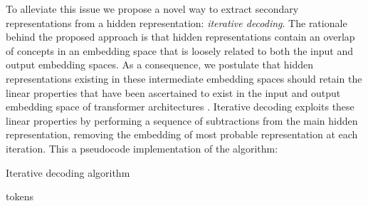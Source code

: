     To alleviate this issue we propose a novel way to extract secondary representations from a hidden representation: \emph{iterative decoding}.
    The rationale behind the proposed approach is that hidden representations contain an overlap of concepts in an embedding space that is loosely related to both the input and output embedding spaces.
    As a consequence, we postulate that hidden representations existing in these intermediate embedding spaces should retain the linear properties that have been ascertained to exist in the input and output embedding space of transformer architectures .
    Iterative decoding exploits these linear properties by performing a sequence of subtractions from the main hidden representation, removing the embedding of most probable representation at each iteration.
    This a pseudocode implementation of the algorithm:
    \begin{algorithm}
        \caption{Iterative decoding algorithm}\label{alg:method_intravisto_iter-dec}
        \begin{algorithmic}
                \ENDIF{}
                \ENDIF{}
            \ENDWHILE{}
            \RETURN tokens
        \end{algorithmic}
    \end{algorithm}

